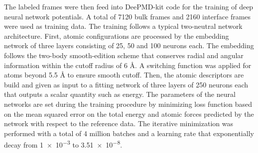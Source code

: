The labeled frames were then feed into DeePMD-kit code
\cite{wang2018deepmd,zeng2023deepmd,lu2021,zhang2018end} for the training of
deep neural network potentials. A total of 7120 bulk frames and 2160 interface
frames were used as training data. The training follows a typical two-neutral
network architecture. First, atomic configurations are processed by the
embedding network of three layers consisting of 25, 50 and 100 neurons each.
The embedding follows the two-body smooth-edition scheme \cite{NEURIPS2018}
that conserves radial and angular information within the cutoff radius of 6
\r{A}. A switching function was applied for atoms beyond 5.5 \r{A} to ensure
smooth cutoff.	Then, the atomic descriptors are build and given as input to a
fitting network of three layers of 250 neurons each that outputs a scalar
quantity such as energy. The parameters of the neural networks are set during
the training procedure by minimizing  loss function based on the mean squared
error on the total energy and atomic forces predicted
by the network with respect to the reference data. The iterative minimization
was performed with a total of 4 million batches and a learning rate that
exponentially decay from \num{1e-3} to \num{3.51e-8}.

